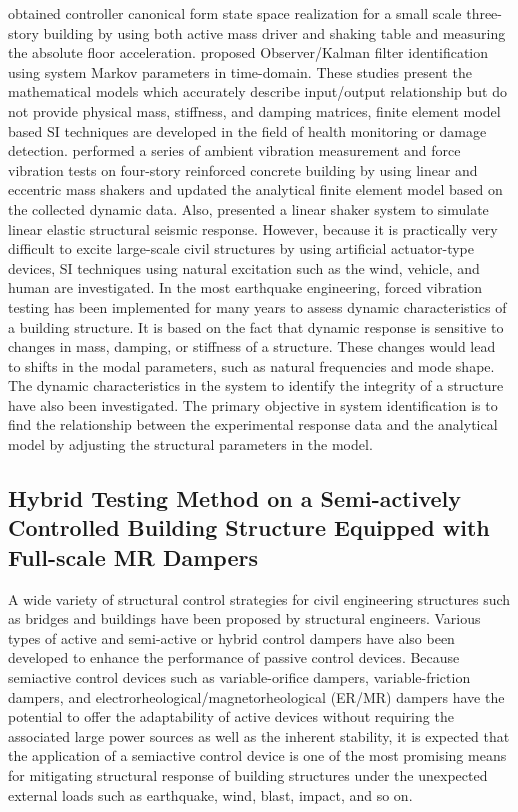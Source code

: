 \citet{dyke1994experimental} obtained controller canonical form state space realization for a small scale three-story building by using both active mass driver and shaking table and measuring the absolute floor acceleration. \citet{juang1994applied} proposed Observer/Kalman filter identification using system Markov parameters in time-domain. These studies present the mathematical models which accurately describe input/output relationship but do not provide physical mass, stiffness, and damping matrices, finite element model based SI techniques are developed in the field of health monitoring or damage detection\citep{van2003sensors}. \citet{yu2005forced} performed a series of ambient vibration measurement and force vibration tests on four-story reinforced concrete building by using linear and eccentric mass shakers and updated the analytical finite element model based on the collected dynamic data. Also, \citet{yu2005forced} presented a linear shaker system to simulate linear elastic structural seismic response. However, because it is practically very difficult to excite large-scale civil structures by using artificial actuator-type devices, SI techniques using natural excitation such as the wind, vehicle, and human are investigated.
In the most earthquake engineering, forced vibration testing has been implemented for many years to assess dynamic characteristics of a building structure. It is based on the fact that dynamic response is sensitive to changes in mass, damping, or stiffness of a structure. These changes would lead to shifts in the modal parameters, such as natural frequencies and mode shape. The dynamic characteristics in the system to identify the integrity of a structure have also been investigated\citep{dyke1994experimental}. The primary objective in system identification is to find the relationship between the experimental response data and the analytical model by adjusting the structural parameters in the model.


\subsection{Hybrid Testing Method on a Semi-actively Controlled Building Structure Equipped with Full-scale MR Dampers}

A wide variety of structural control strategies for civil engineering structures such as bridges and buildings have been proposed by structural engineers\citep{adeli1999control}. Various types of active and semi-active or hybrid control dampers have also been developed to enhance the performance of passive control devices\citep{kim2005hybrid1,kim2005hybrid2}. Because semiactive control devices such as variable-orifice dampers, variable-friction dampers, and electrorheological/magnetorheological (ER/MR) dampers have the potential to offer the adaptability of active devices without requiring the associated large power sources as well as the inherent stability, it is expected that the application of a semiactive control device is one of the most promising means for mitigating structural response of building structures under the unexpected external loads such as earthquake, wind, blast, impact, and so on. 

